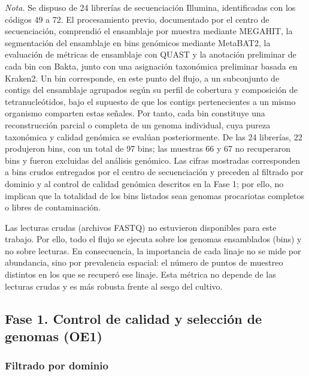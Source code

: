 \begin{table}[htbp]
\vspace{0.5em}

\begin{minipage}{0.95\textwidth}
\footnotesize
\textit{Nota.} Se dispuso de 24 librerías de secuenciación Illumina, identificadas con los códigos 49 a 72. El procesamiento previo, documentado por el centro de secuenciación, comprendió el ensamblaje por muestra mediante MEGAHIT, la segmentación del ensamblaje en bins genómicos mediante MetaBAT2, la evaluación de métricas de ensamblaje con QUAST y la anotación preliminar de cada bin con Bakta, junto con una asignación taxonómica preliminar basada en Kraken2. Un bin corresponde, en este punto del flujo, a un subconjunto de contigs del ensamblaje agrupados según su perfil de cobertura y composición de tetranucleótidos, bajo el supuesto de que los contigs pertenecientes a un mismo organismo comparten estas señales. Por tanto, cada bin constituye una reconstrucción parcial o completa de un genoma individual, cuya pureza taxonómica y calidad genómica se evalúan posteriormente. De las 24 librerías, 22 produjeron bins, con un total de 97 bins; las muestras 66 y 67 no recuperaron bins y fueron excluidas del análisis genómico. Las cifras mostradas corresponden a bins crudos entregados por el centro de secuenciación y preceden al filtrado por dominio y al control de calidad genómica descritos en la Fase 1; por ello, no implican que la totalidad de los bins listados sean genomas procariotas completos o libres de contaminación.
\end{minipage}

\end{table}
Las lecturas crudas (archivos FASTQ) no estuvieron disponibles para este
trabajo. Por ello, todo el flujo se ejecuta sobre los genomas ensamblados
(bins) y no sobre lecturas. En consecuencia, la importancia de cada linaje no
se mide por abundancia, sino por prevalencia espacial: el número de puntos de
muestreo distintos en los que se recuperó ese linaje. Esta métrica no depende
de las lecturas crudas y es más robusta frente al sesgo del cultivo.


\subsection{Fase 1. Control de calidad y selección de genomas (OE1)}

\subsubsection{Filtrado por dominio}

